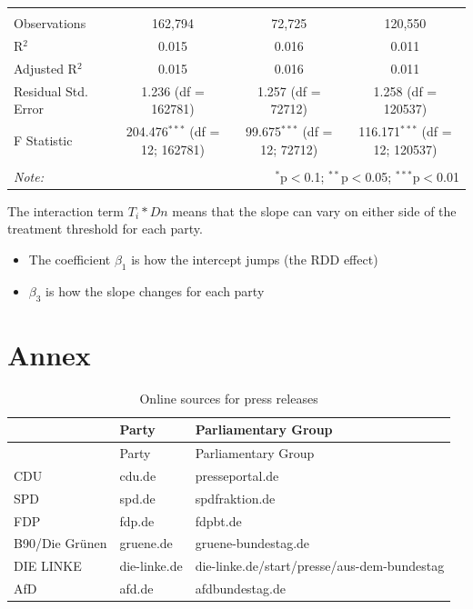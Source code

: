 \documentclass[
]{article}
\providecommand{\tightlist}{%
  \setlength{\itemsep}{0pt}\setlength{\parskip}{0pt}}
\begin{document}
\begin{table}[!htbp]
\begin{tabular}{@{\extracolsep{5pt}}lccc}
 \hline \\[-1.8ex] 
Observations & 162,794 & 72,725 & 120,550 \\ 
R$^{2}$ & 0.015 & 0.016 & 0.011 \\ 
Adjusted R$^{2}$ & 0.015 & 0.016 & 0.011 \\ 
Residual Std. Error & 1.236 (df = 162781) & 1.257 (df = 72712) & 1.258 (df = 120537) \\ 
F Statistic & 204.476$^{***}$ (df = 12; 162781) & 99.675$^{***}$ (df = 12; 72712) & 116.171$^{***}$ (df = 12; 120537) \\ 
\hline 
\hline \\[-1.8ex] 
\textit{Note:}  & \multicolumn{3}{r}{$^{*}$p$<$0.1; $^{**}$p$<$0.05; $^{***}$p$<$0.01} \\ 
\end{tabular} 
\end{table}

The interaction term \(T_i*Dn\) means that the slope can vary on either
side of the treatment threshold for each party.

\begin{itemize}
\tightlist
\item
  The coefficient \(\beta_1\) is how the intercept jumps (the RDD
  effect)
\item
  \(\beta_3\) is how the slope changes for each party
\end{itemize}

\hypertarget{annex}{%
\section{Annex}\label{annex}}

\begin{longtable}[]{@{}lll@{}}
\caption{Online sources for press releases
\label{table:press_releases_sources}}\tabularnewline
\toprule
& Party & Parliamentary Group\tabularnewline
\midrule
\endfirsthead
\toprule
& Party & Parliamentary Group\tabularnewline
\midrule
\endhead
CDU & cdu.de & presseportal.de\tabularnewline
SPD & spd.de & spdfraktion.de\tabularnewline
FDP & fdp.de & fdpbt.de\tabularnewline
B90/Die Grünen & gruene.de & gruene-bundestag.de\tabularnewline
DIE LINKE & die-linke.de &
die-linke.de/start/presse/aus-dem-bundestag\tabularnewline
AfD & afd.de & afdbundestag.de\tabularnewline
\bottomrule
\end{longtable}
\end{document}

